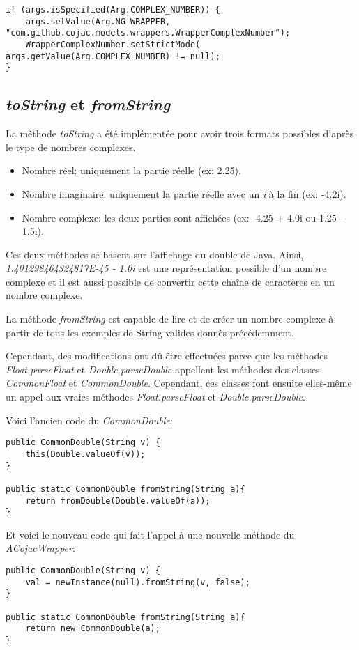 \begin{verbatim}
if (args.isSpecified(Arg.COMPLEX_NUMBER)) {
    args.setValue(Arg.NG_WRAPPER, "com.github.cojac.models.wrappers.WrapperComplexNumber");
    WrapperComplexNumber.setStrictMode( args.getValue(Arg.COMPLEX_NUMBER) != null);
}
\end{verbatim}

\subsection{\textit{toString} et \textit{fromString}}

La méthode \textit{toString} a été implémentée pour avoir trois formats possibles d'après le type de nombres complexes.

\begin{itemize}
    \item Nombre réel: uniquement la partie réelle (ex: 2.25).
    \item Nombre imaginaire: uniquement la partie réelle avec un \textit{i} à la fin (ex: -4.2i).
    \item Nombre complexe: les deux parties sont affichées (ex: -4.25 + 4.0i ou 1.25 - 1.5i).
\end{itemize}

Ces deux méthodes se basent sur l'affichage du double de Java. Ainsi, \textit{1.401298464324817E-45 - 1.0i} est une représentation possible d'un nombre complexe et il est aussi possible de convertir cette chaîne de caractères en un nombre complexe.

La méthode \textit{fromString} est capable de lire et de créer un nombre complexe à partir de tous les exemples de String valides donnés précédemment.

Cependant, des modifications ont dû être effectuées parce que les méthodes \textit{Float.parseFloat} et \textit{Double.parseDouble} appellent les méthodes des classes \textit{CommonFloat} et \textit{CommonDouble}. Cependant, ces classes font ensuite elles-même un appel aux vraies méthodes \textit{Float.parseFloat} et \textit{Double.parseDouble}.

Voici l'ancien code du \textit{CommonDouble}:

\begin{verbatim}
public CommonDouble(String v) {
    this(Double.valueOf(v));
}

public static CommonDouble fromString(String a){
    return fromDouble(Double.valueOf(a));
}
\end{verbatim}

\begin{minipage2}
Et voici le nouveau code qui fait l'appel à une nouvelle méthode du \textit{ACojacWrapper}:

\begin{verbatim}
public CommonDouble(String v) {
    val = newInstance(null).fromString(v, false);
}

public static CommonDouble fromString(String a){
    return new CommonDouble(a);
}
\end{verbatim}
\end{minipage2}
